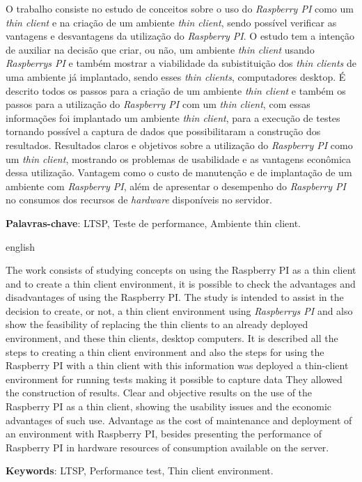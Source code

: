 \documentclass[
	12pt,				%
	openright,			%
	twoside,			%
	a4paper,			%
	chapter=TITLE,		%
	english,			%
	brazil				%
	]{abntex2}
\begin{document}
\setlength{\absparsep}{18pt} %
\begin{resumo}
O trabalho consiste no estudo de conceitos sobre o uso do \textit{Raspberry PI} como um \textit{thin client} e na criação de um ambiente \textit{thin client}, sendo possível verificar as vantagens e desvantagens da utilização do \textit{Raspberry PI}. O estudo tem a intenção de auxiliar na decisão que criar, ou não, um ambiente \textit{thin client} usando \textit{Raspberrys PI} e também mostrar a viabilidade da subistituição dos \textit{thin clients} de uma ambiente já implantado, sendo esses \textit{thin clients}, computadores desktop. É descrito todos os passos para a criação de um ambiente \textit{thin client} e também os passos para a utilização do \textit{Raspberry PI} com um \textit{thin client}, com essas informações foi implantado um ambiente \textit{thin client}, para a execução de testes tornando possível a captura de dados que possibilitaram a construção dos resultados. Resultados claros e objetivos sobre a utilização do \textit{Raspberry PI} como um \textit{thin client}, mostrando os problemas de usabilidade e as vantagens econômica dessa utilização. Vantagem como o custo de manutenção e de implantação de um ambiente com \textit{Raspberry PI}, além de apresentar o desempenho do \textit{Raspberry PI} no consumos dos recursos de \textit{hardware} disponíveis no servidor.


 \textbf{Palavras-chave}: LTSP, Teste de performance, Ambiente thin client.	%
\end{resumo}

\begin{resumo}[Abstract]
 \begin{otherlanguage*}{english}
   
   The work consists of studying concepts on using the Raspberry PI as a thin client and to create a thin client environment, it is possible to check the advantages and disadvantages of using the Raspberry PI. The study is intended to assist in the decision to create, or not, a thin client environment using \textit{Raspberrys PI} and also show the feasibility of replacing the thin clients to an already deployed environment, and these thin clients, desktop computers. It is described all the steps to creating a thin client environment and also the steps for using the Raspberry PI with a thin client with this information was deployed a thin-client environment for running tests making it possible to capture data They allowed the construction of results. Clear and objective results on the use of the Raspberry PI as a thin client, showing the usability issues and the economic advantages of such use. Advantage as the cost of maintenance and deployment of an environment with Raspberry PI, besides presenting the performance of Raspberry PI in hardware resources of consumption available on the server.

   \vspace{\onelineskip}
 
   \noindent 
   \textbf{Keywords}: LTSP, Performance test, Thin client environment.
 \end{otherlanguage*}
\end{resumo}
\end{document}
